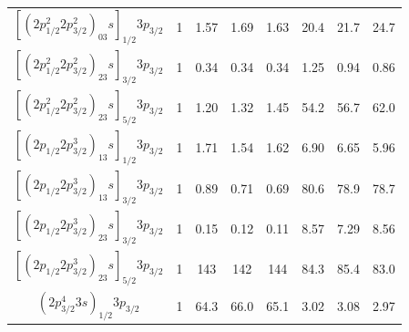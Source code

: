 \documentclass{elsart}
\begin{document}
\begin{table}
\begin{tabular}{*{8}{c}}
$[(2p^2_{1/2}2p^2_{3/2})_03s]_{1/2}3p_{3/2}$&1&1.57&1.69&1.63&20.4&21.7&24.7\\
$[(2p^2_{1/2}2p^2_{3/2})_23s]_{3/2}3p_{3/2}$&1&0.34&0.34&0.34&1.25&0.94&0.86\\
$[(2p^2_{1/2}2p^2_{3/2})_23s]_{5/2}3p_{3/2}$&1&1.20&1.32&1.45&54.2&56.7&62.0\\
$[(2p_{1/2}2p^3_{3/2})_13s]_{1/2}3p_{3/2}$&1&1.71&1.54&1.62&6.90&6.65&5.96\\
$[(2p_{1/2}2p^3_{3/2})_13s]_{3/2}3p_{3/2}$&1&0.89&0.71&0.69&80.6&78.9&78.7\\
$[(2p_{1/2}2p^3_{3/2})_23s]_{3/2}3p_{3/2}$&1&0.15&0.12&0.11&8.57&7.29&8.56\\
$[(2p_{1/2}2p^3_{3/2})_23s]_{5/2}3p_{3/2}$&1&143&142&144&84.3&85.4&83.0\\
$(2p^4_{3/2}3s)_{1/2}3p_{3/2}$&1&64.3&66.0&65.1&3.02&3.08&2.97\\
\hline\hline
\end{tabular}
\end{table}
\end{document}
